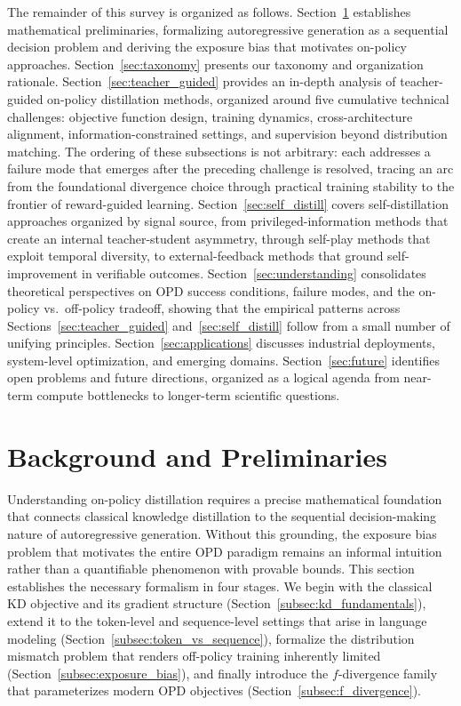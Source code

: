 \documentclass{article} %
\begin{document}
The remainder of this survey is organized as follows. Section~\ref{sec:background} establishes mathematical preliminaries, formalizing autoregressive generation as a sequential decision problem and deriving the exposure bias that motivates on-policy approaches. Section~\ref{sec:taxonomy} presents our taxonomy and organization rationale. Section~\ref{sec:teacher_guided} provides an in-depth analysis of teacher-guided on-policy distillation methods, organized around five cumulative technical challenges: objective function design, training dynamics, cross-architecture alignment, information-constrained settings, and supervision beyond distribution matching. The ordering of these subsections is not arbitrary: each addresses a failure mode that emerges after the preceding challenge is resolved, tracing an arc from the foundational divergence choice through practical training stability to the frontier of reward-guided learning. Section~\ref{sec:self_distill} covers self-distillation approaches organized by signal source, from privileged-information methods that create an internal teacher-student asymmetry, through self-play methods that exploit temporal diversity, to external-feedback methods that ground self-improvement in verifiable outcomes. Section~\ref{sec:understanding} consolidates theoretical perspectives on OPD success conditions, failure modes, and the on-policy vs.\ off-policy tradeoff, showing that the empirical patterns across Sections~\ref{sec:teacher_guided} and~\ref{sec:self_distill} follow from a small number of unifying principles. Section~\ref{sec:applications} discusses industrial deployments, system-level optimization, and emerging domains. Section~\ref{sec:future} identifies open problems and future directions, organized as a logical agenda from near-term compute bottlenecks to longer-term scientific questions.


\section{Background and Preliminaries}
\label{sec:background}

Understanding on-policy distillation requires a precise mathematical foundation that connects classical knowledge distillation to the sequential decision-making nature of autoregressive generation. Without this grounding, the exposure bias problem that motivates the entire OPD paradigm remains an informal intuition rather than a quantifiable phenomenon with provable bounds. This section establishes the necessary formalism in four stages. We begin with the classical KD objective and its gradient structure (Section~\ref{subsec:kd_fundamentals}), extend it to the token-level and sequence-level settings that arise in language modeling (Section~\ref{subsec:token_vs_sequence}), formalize the distribution mismatch problem that renders off-policy training inherently limited (Section~\ref{subsec:exposure_bias}), and finally introduce the $f$-divergence family that parameterizes modern OPD objectives (Section~\ref{subsec:f_divergence}).
\end{document}
